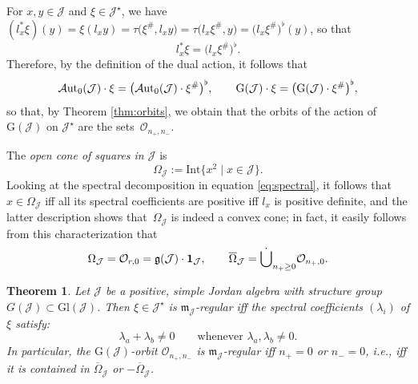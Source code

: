 \documentclass[10pt,a4paper]{amsart}
\numberwithin{equation}{section}
\newtheorem{Theorem}{Theorem}[section]
\newcommand{\be}{\begin{equation}}
\newcommand{\ee}{\end{equation}}
\newcommand{\Aut}{\mathcal{A}{\rm ut}}
\newcommand{\ocal}{\mathcal{O}}
\newcommand{\Jcal}{\mathcal{J}}
\newcommand{\m}{\mathfrak{m}}
\newcommand{\G}{\mathrm{G}}
\newcommand{\Gl}{{\mathrm{Gl}}}
\newcommand{\g}{{\mathfrak{g}}}
\renewcommand{\m}{{\mathfrak m}}
\begin{document}
For $x,y \in \Jcal$ and $\xi \in \Jcal^\star$, we have $(l_x^\ast \xi)(y) = \xi (l_x y) = \tau\big(\xi^{\#}, l_x y\big) = \tau\big(l_x \xi^{\#}, y\big) = \big(l_x \xi^{\#}\big)^\flat (y)$, so that
\be \label{eq:l*dual}
l_x^\ast \xi = \big(l_x \xi^{\#}\big)^\flat.
\ee
Therefore, by the definition of the dual action,
it follows that
\be \label{eq:dual-orbit}
\Aut_0(\Jcal) \cdot \xi = \big(\Aut_0(\Jcal) \cdot \xi^{\#}\big)^\flat, \qquad \G(\Jcal) \cdot \xi = \big(\G(\Jcal) \cdot \xi^{\#}\big)^\flat,
\ee
so that, by Theorem \ref{thm:orbits}, we obtain that the orbits of the action of $\G(\Jcal)$ on $\Jcal^\star$ are the sets~$\ocal_{n_+,n_-}$.

The {\em open cone of squares in $\Jcal$ }is
\[
\Omega_\Jcal := \mathrm{Int} \big\{x^2 \mid x \in \Jcal\big\}.
\]
Looking at the spectral decomposition in equation \eqref{eq:spectral}, it follows that $x \in \Omega_\Jcal$ iff all its spectral coefficients are positive iff $l_x$ is positive definite, and the latter description shows that~$\Omega_\Jcal$ is indeed a convex cone; in fact, it easily follows from this characterization that
\begin{gather} \Omega_\Jcal = \ocal_{r,0} = \g(\Jcal) \cdot {\bf 1}_\Jcal,\qquad
\overline{\Omega}_\Jcal = \dot \bigcup_{n_+ \geq 0} \ocal_{n_+,0}.\label{eq:positive-orbits}
\end{gather}

\begin{Theorem} \label{thm:main}
Let $\Jcal$ be a positive, simple Jordan algebra with structure group $G(\Jcal) \subset \Gl(\Jcal)$.
Then $\xi \in \Jcal^\star$ is $\m_\Jcal$-regular iff the spectral coefficients $(\lambda_i)$ of $\xi$ satisfy:
\be \label{eq:form-regular}
\lambda_a + \lambda_b \neq 0 \qquad \text{whenever $\lambda_a, \lambda_b \neq 0$}.
\ee
In particular, the $\G(\Jcal)$-orbit $\ocal_{n_+,n_-}$ is $\m_\Jcal$-regular iff $n_+ = 0$ or $n_-=0$, i.e., iff it is contained in $\overline{\Omega}_\Jcal$ or $-\overline{\Omega}_\Jcal$.
\end{Theorem}
\end{document}

